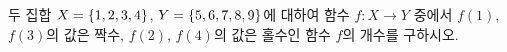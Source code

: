 두 집합 $X=\{1{,}\mkern3mu\mathopen{}2{,}\mkern3mu\mathopen{}3{,}\mkern3mu\mathopen{}4\}$, $Y=\{5{,}\mkern3mu\mathopen{}6{,}\mkern3mu\mathopen{}7{,}\mkern3mu\mathopen{}8{,}\mkern3mu\mathopen{}9\}$에 대하여 함수 $f:X\longrightarrow Y$ 중에서 $f(1)$, $f(3)$의 값은 짝수, $f(2)$, $f(4)$의 값은 홀수인 함수 $f$의 개수를 구하시오.
